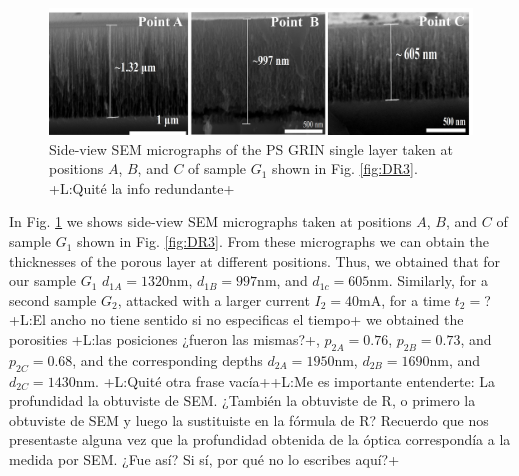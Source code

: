 \documentclass{article}
\newcommand{\notaL}[1]{{\color{blue}+L:#1+}}
\begin{document}
\begin{figure}
  \centering
  \includegraphics[width=\textwidth]{Images/semD11}
  \caption{Side-view SEM micrographs of the PS GRIN single layer
    taken at positions $A$, $B$, and $C$ of sample $G_1$ shown in
    Fig. \ref{fig:DR3}.
    \notaL{Quité la info redundante}}
  \label{fig:DR4}
\end{figure}

In Fig. \ref{fig:DR4} we shows side-view SEM micrographs taken at
positions $A$, $B$, and $C$ of sample $G_1$ shown in
Fig. \ref{fig:DR3}. From these micrographs we can
obtain the thicknesses of the porous layer at different
positions. Thus, we obtained that for our sample $G_1$
$d_{1A}= 1320\text{nm}$, $ d_{1B} = 997\text{nm}$, and $d_{1c} = 605
\text{nm}$. Similarly, for a second sample $G_2$, attacked with a
larger current $I_2 =40 \text{mA}$, for a time $t_2=$?\notaL{El ancho no
  tiene sentido si no especificas el tiempo} we obtained the
porosities \notaL{las posiciones ¿fueron las mismas?}, $p_{2A}= 0.76$, $p_{2B}=
0.73$, and $p_{2C}= 0.68$, and the corresponding depths $d_{2A}=1950\text{nm}$,
$d_{2B}=1690\text{nm}$, and $d_{2C}= 1430\text{nm}$. \notaL{Quité otra
  frase vacía}\notaL{Me es importante entenderte: La profundidad la
  obtuviste de SEM. ¿También la obtuviste de R, o primero la obtuviste
  de SEM y luego la sustituiste en la fórmula de R? Recuerdo que nos
  presentaste alguna vez que la profundidad obtenida de la óptica
  correspondía a la medida por SEM. ¿Fue así? Si sí, por qué no lo
  escribes aquí?}
\end{document}
